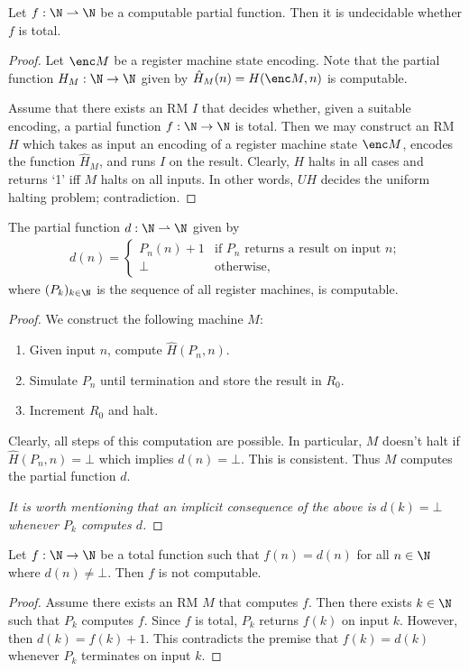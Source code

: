 \documentclass{article}
\begin{document}
\begin{claim*}[a, 2]
	Let $f:\N\rightharpoonup\N$ be a computable partial function. Then it is undecidable whether $f$
	is total.
	\begin{proof}
		Let $\enc M$ be a register machine state encoding.  Note that the partial function $H_M:\N\to\N$
		given by $\hat H_M(n)=H(\enc M, n)$ is computable.

		Assume that there exists an RM $I$ that decides whether, given a suitable encoding, a partial
		function $f:\N\to\N$ is total. Then we may construct an RM $H$ which takes as input an encoding
		of a register machine state $\enc M$, encodes the function $\hat H_M$, and runs $I$ on the result.
		Clearly, $H$ halts in all cases and returns `1' iff $M$ halts on all inputs. In other words,
		$UH$ decides the uniform halting problem; contradiction.
	\end{proof}
\end{claim*}

\begin{claim*}[b]
	The partial function $d:\N\rightharpoonup\N$ given by
	\begin{align*}
		d(n)=\begin{cases}
			P_n(n)+1 & \text{if $P_n$ returns a result on input $n$;} \\
			\bot     & \text{otherwise,}
		\end{cases}
	\end{align*}
	where $(P_k)_{k\in\N}$ is the sequence of all register machines, is
	computable.
	\begin{proof}
		We construct the following machine $M$:
		\begin{enumerate}
			\item Given input $n$, compute $\hat H(P_n,n)$.
			\item Simulate $P_n$ until termination and store the result in $R_0$.
			\item Increment $R_0$ and halt.
		\end{enumerate}
		Clearly, all steps of this computation are possible. In particular, $M$ doesn't halt
		if $\hat H(P_n,n)=\bot$ which implies $d(n)=\bot$. This is consistent. Thus $M$
		computes the partial function $d$.

		\emph{It is worth mentioning that an implicit consequence of the above is $d(k)=\bot$
			whenever $P_k$ computes $d$.}
	\end{proof}
\end{claim*}

\begin{claim*}[c]
	Let $f:\N\to\N$ be a total function such that $f(n)=d(n)$ for all $n\in\N$ where
	$d(n)\not=\bot$. Then $f$ is not computable.
	\begin{proof}
		Assume there exists an RM $M$ that computes $f$. Then there exists $k\in\N$ such that
		$P_k$ computes $f$. Since $f$ is total, $P_k$ returns $f(k)$ on input $k$. However,
		then $d(k)=f(k)+1$. This contradicts the premise that $f(k)=d(k)$ whenever $P_k$ terminates
		on input $k$.
	\end{proof}
\end{claim*}
\end{document}
